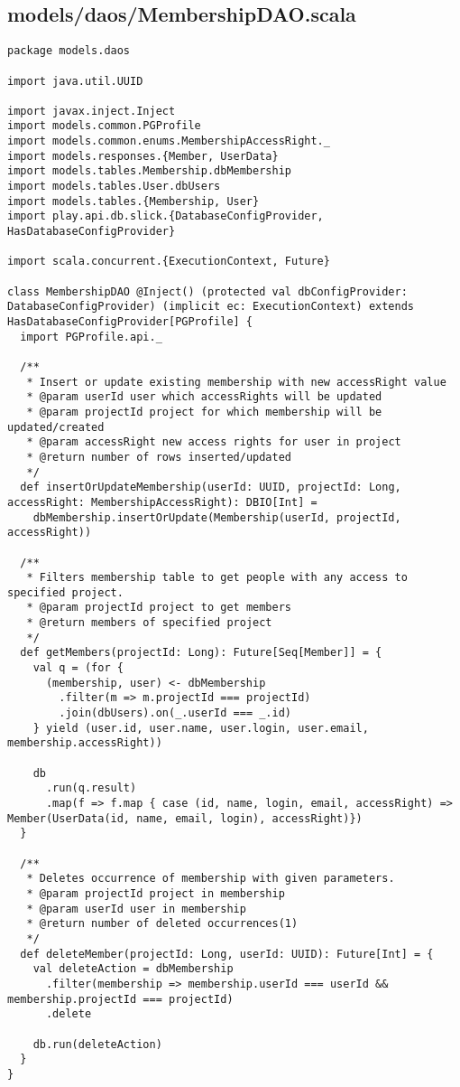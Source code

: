 \subsection{models/daos/MembershipDAO.scala}
\begin{lstlisting}
package models.daos

import java.util.UUID

import javax.inject.Inject
import models.common.PGProfile
import models.common.enums.MembershipAccessRight._
import models.responses.{Member, UserData}
import models.tables.Membership.dbMembership
import models.tables.User.dbUsers
import models.tables.{Membership, User}
import play.api.db.slick.{DatabaseConfigProvider, HasDatabaseConfigProvider}

import scala.concurrent.{ExecutionContext, Future}

class MembershipDAO @Inject() (protected val dbConfigProvider: DatabaseConfigProvider) (implicit ec: ExecutionContext) extends HasDatabaseConfigProvider[PGProfile] {
  import PGProfile.api._

  /**
   * Insert or update existing membership with new accessRight value
   * @param userId user which accessRights will be updated
   * @param projectId project for which membership will be updated/created
   * @param accessRight new access rights for user in project
   * @return number of rows inserted/updated
   */
  def insertOrUpdateMembership(userId: UUID, projectId: Long, accessRight: MembershipAccessRight): DBIO[Int] =
    dbMembership.insertOrUpdate(Membership(userId, projectId, accessRight))

  /**
   * Filters membership table to get people with any access to specified project.
   * @param projectId project to get members
   * @return members of specified project
   */
  def getMembers(projectId: Long): Future[Seq[Member]] = {
    val q = (for {
      (membership, user) <- dbMembership
        .filter(m => m.projectId === projectId)
        .join(dbUsers).on(_.userId === _.id)
    } yield (user.id, user.name, user.login, user.email, membership.accessRight))

    db
      .run(q.result)
      .map(f => f.map { case (id, name, login, email, accessRight) => Member(UserData(id, name, email, login), accessRight)})
  }

  /**
   * Deletes occurrence of membership with given parameters.
   * @param projectId project in membership
   * @param userId user in membership
   * @return number of deleted occurrences(1)
   */
  def deleteMember(projectId: Long, userId: UUID): Future[Int] = {
    val deleteAction = dbMembership
      .filter(membership => membership.userId === userId && membership.projectId === projectId)
      .delete

    db.run(deleteAction)
  }
}
\end{lstlisting}
